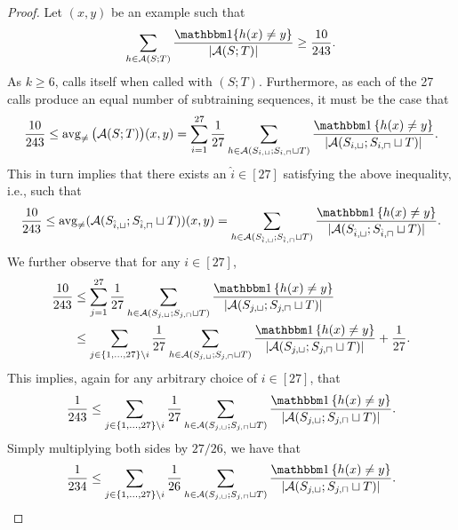 \begin{proof}
Let $(x,y)$ be an example such that  
\[ \sum_{h\in \erm(S;T)} \frac{\ind\{ h(x)\not=y \}}{|\erm(S;T)|} \geq \frac{10}{243}. \]
As $k\geq 6$,  calls itself when called with $(S;T)$. Furthermore, as each of the 27 calls produce an equal number of subtraining sequences, it must be the case that
\begin{align*}
    \frac{10}{243} \leq \avg \big( \erm(S;T) \big) (x,y) = \sum_{i=1}^{27}\frac{1}{27}\sum_{h\in \erm(S_{i,\sqcup}; S_{i,\sqcap} \sqcup T)} \frac{\ind\left\{ h(x)\not=y \right\} }{|\erm(S_{i,\sqcup}; S_{i,\sqcap} \sqcup T)|}. 
\end{align*} 
This in turn implies that there exists an $\hat{i} \in [27]$ satisfying the above inequality, i.e., such that
\begin{align*}
    \frac{10}{243}\leq\avg(\erm(S_{\hat{i},\sqcup}; S_{\hat{i},\sqcap}\sqcup T))(x,y)= \sum_{h\in \erm(S_{\hat{i},\sqcup}; S_{\hat{i},\sqcap} \sqcup T)} \frac{\ind\left\{ h(x)\not=y \right\} }{|\erm(S_{\hat{i},\sqcup}; S_{\hat{i},\sqcap} \sqcup T)|} \nonumber.
\end{align*}
We further observe that for any $i\in [27]$, 
\begin{align*}
    \frac{10}{243} &\leq \sum_{j=1}^{27}\frac{1}{27}\sum_{h\in \erm(S_{j,\sqcup}; S_{j,\sqcap} \sqcup T)} \frac{\ind\left\{ h(x)\not=y \right\} }{|\erm(S_{j,\sqcup}; S_{j,\sqcap} \sqcup T)|}
    \\
    &\leq
    \sum_{j\in \{1,\ldots,27  \}\backslash i }\frac{1}{27}\sum_{h\in \erm(S_{j,\sqcup}; S_{j,\sqcap} \sqcup T)} \frac{\ind\left\{ h(x)\not=y \right\} }{|\erm(S_{j,\sqcup}; S_{j,\sqcap} \sqcup T)|} +\frac{1}{27}.
\end{align*} 
This implies, again for any arbitrary choice of $i \in [27]$, that 
\begin{align*}
  \frac{1}{243}\leq
    \sum_{j\in \{1,\ldots,27  \}\backslash i }\frac{1}{27}\sum_{h\in \erm(S_{j,\sqcup}; S_{j,\sqcap} \sqcup T)} \frac{\ind\left\{ h(x)\not=y \right\} }{|\erm(S_{j,\sqcup}; S_{j,\sqcap} \sqcup T)|} \nonumber.
\end{align*}
Simply multiplying both sides by $27 / 26$, we have that 
\begin{align}\label{eq:relationerror}
    \frac{1}{234}\leq
      \sum_{j\in \{1,\ldots,27  \}\backslash i }\frac{1}{26}\sum_{h\in \erm(S_{j,\sqcup}; S_{j,\sqcap} \sqcup T)} \frac{\ind\left\{ h(x)\not=y \right\} }{|\erm(S_{j,\sqcup}; S_{j,\sqcap} \sqcup T)|}.
\end{align}

\end{proof}
